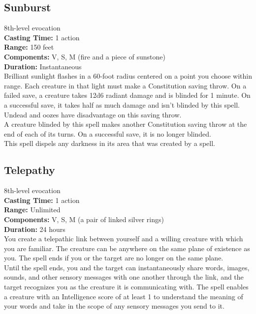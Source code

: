 \documentclass[11pt, A4paper, english]{article}
\begin{document}
		\subsection{Sunburst}
8th-level evocation \\
\textbf{Casting Time:} 1 action \\
\textbf{Range:} 150 feet \\
\textbf{Components:} V, S, M (fire and a piece of sunstone) \\
\textbf{Duration:} Instantaneous \\
Brilliant sunlight flashes in a 60-foot radius centered on a point you choose within range. Each creature in that light must make a Constitution saving throw. On a failed save, a creature takes 12d6 radiant damage and is blinded for 1 minute. On a successful save, it takes half as much damage and isn’t blinded by this spell. Undead and oozes have disadvantage on this saving throw. \\
A creature blinded by this spell makes another Constitution saving throw at the end of each of its turns. On a successful save, it is no longer blinded. \\
This spell dispels any darkness in its area that was created by a spell.

		\subsection{Telepathy}
8th-level evocation \\
\textbf{Casting Time:} 1 action \\
\textbf{Range:} Unlimited \\
\textbf{Components:} V, S, M (a pair of linked silver rings) \\
\textbf{Duration:} 24 hours \\
You create a telepathic link between yourself and a willing creature with which you are familiar. The creature can be anywhere on the same plane of existence as you. The spell ends if you or the target are no longer on the same plane. \\
Until the spell ends, you and the target can instantaneously share words, images, sounds, and other sensory messages with one another through the link, and the target recognizes you as the creature it is communicating with. The spell enables a creature with an Intelligence score of at least 1 to understand the meaning of your words and take in the scope of any sensory messages you send to it.
\end{document}
